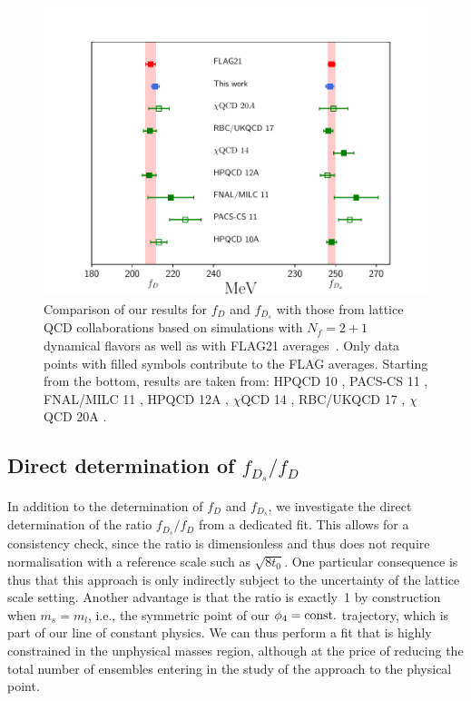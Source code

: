 \begin{figure}
	\centering
	\includegraphics[scale=0.70]{./cap6/figs/fds/fds_comparison.pdf}
	\caption{Comparison of our results for $f_D$ and $f_{D_s}$  with those from lattice QCD collaborations based on simulations with $N_f=2+1$ dynamical flavors as well as with FLAG21 averages~\cite{FlavourLatticeAveragingGroupFLAG:2021npn}.
          Only data points with filled symbols contribute to  the FLAG averages. Starting from the bottom, results are taken from: HPQCD 10 \cite{Davies:2010ip}, PACS-CS 11 \cite{PACS-CS:2011ngu}, FNAL/MILC 11 \cite{FermilabLattice:2011njy}, HPQCD 12A \cite{Na:2012iu}, $\chi$QCD 14 \cite{Yang:2014sea}, RBC/UKQCD 17 \cite{Boyle:2017jwu},  $\chi$QCD 20A \cite{Chen:2020qma}.
          }
	\label{fig:fds_comparison}
\end{figure}


\subsection{Direct determination of $f_{D_s}/f_D$}

In addition to the determination of $f_D$ and $f_{D_s}$, we investigate the direct determination
of the ratio $f_{D_s}/f_D$ from a dedicated fit. This allows for a consistency check, since
the ratio is dimensionless and thus does not require normalisation with a reference scale
such as $\sqrt{8t_0}$. One particular consequence is thus that this approach is only
indirectly subject to the uncertainty of the lattice scale setting. Another advantage
is that the ratio is exactly~1 by construction when $m_s=m_l$, i.e., the symmetric
point of our $\phi_4={\rm const.}$ trajectory, which is part of our line of constant
physics. We can thus perform a fit that is highly constrained in the unphysical masses
region, although at the price of reducing the total number of ensembles entering in the study of the approach to the physical point.

